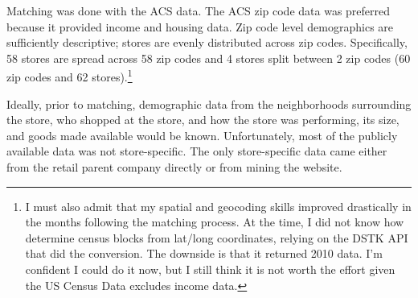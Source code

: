 \documentclass[12pt,letterpaperpaper,]{book}
\begin{document}
Matching was done with the ACS data. The ACS zip code data was preferred
because it provided income and housing data. Zip code level demographics
are sufficiently descriptive; stores are evenly distributed across zip
codes. Specifically, 58 stores are spread across 58 zip codes and 4
stores split between 2 zip codes (60 zip codes and 62 stores).\footnote{I
  must also admit that my spatial and geocoding skills improved
  drastically in the months following the matching process. At the time,
  I did not know how determine census blocks from lat/long coordinates,
  relying on the DSTK API that did the conversion. The downside is that
  it returned 2010 data. I'm confident I could do it now, but I still
  think it is not worth the effort given the US Census Data excludes
  income data.}

Ideally, prior to matching, demographic data from the neighborhoods
surrounding the store, who shopped at the store, and how the store was
performing, its size, and goods made available would be known.
Unfortunately, most of the publicly available data was not
store-specific. The only store-specific data came either from the retail
parent company directly or from mining the website.
\end{document}

